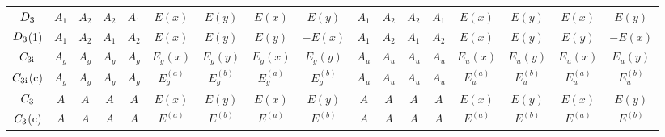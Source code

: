 \documentclass[fleqn,9pt,landscape]{jsarticle}
\begin{document}
\begin{table}[ht!]
\begin{center}
\begin{tabular}{c|cccccccc|cccccccc}
$D_{\rm 3}$ & $A_{1}$ & $A_{2}$ & $A_{2}$ & $A_{1}$ & $E(x)$ & $E(y)$ & $E(x)$ & $E(y)$ & $A_{1}$ & $A_{2}$ & $A_{2}$ & $A_{1}$ & $E(x)$ & $E(y)$ & $E(x)$ & $E(y)$ \\
$D_{\rm 3}$(1) & $A_{1}$ & $A_{2}$ & $A_{1}$ & $A_{2}$ & $E(x)$ & $E(y)$ & $E(y)$ & $-E(x)$ & $A_{1}$ & $A_{2}$ & $A_{1}$ & $A_{2}$ & $E(x)$ & $E(y)$ & $E(y)$ & $-E(x)$ \\
$C_{\rm 3i}$ & $A_{g}$ & $A_{g}$ & $A_{g}$ & $A_{g}$ & $E_{g}(x)$ & $E_{g}(y)$ & $E_{g}(x)$ & $E_{g}(y)$ & $A_{u}$ & $A_{u}$ & $A_{u}$ & $A_{u}$ & $E_{u}(x)$ & $E_{u}(y)$ & $E_{u}(x)$ & $E_{u}(y)$ \\
$C_{\rm 3i}$(c) & $A_{g}$ & $A_{g}$ & $A_{g}$ & $A_{g}$ & $E_{g}^{(a)}$ & $E_{g}^{(b)}$ & $E_{g}^{(a)}$ & $E_{g}^{(b)}$ & $A_{u}$ & $A_{u}$ & $A_{u}$ & $A_{u}$ & $E_{u}^{(a)}$ & $E_{u}^{(b)}$ & $E_{u}^{(a)}$ & $E_{u}^{(b)}$ \\
$C_{\rm 3}$ & $A$ & $A$ & $A$ & $A$ & $E(x)$ & $E(y)$ & $E(x)$ & $E(y)$ & $A$ & $A$ & $A$ & $A$ & $E(x)$ & $E(y)$ & $E(x)$ & $E(y)$ \\
$C_{\rm 3}$(c) & $A$ & $A$ & $A$ & $A$ & $E^{(a)}$ & $E^{(b)}$ & $E^{(a)}$ & $E^{(b)}$ & $A$ & $A$ & $A$ & $A$ & $E^{(a)}$ & $E^{(b)}$ & $E^{(a)}$ & $E^{(b)}$ \\
 \hline \hline
\end{tabular}
\end{center}
\end{table}
\newpage
\end{document}
